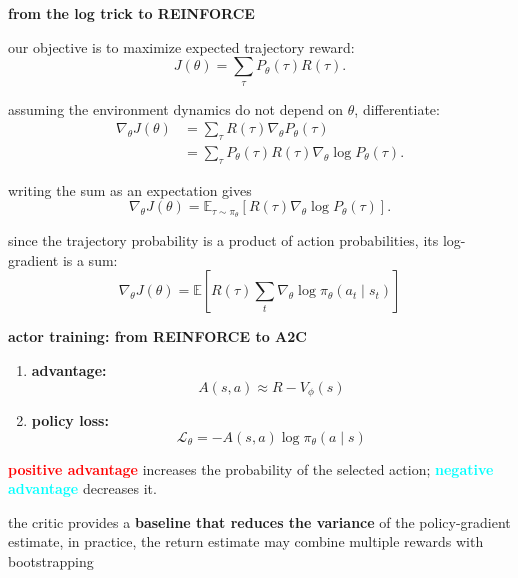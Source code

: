 \documentclass[xcolor=dvipsnames]{beamer}
\begin{document}
\begin{frame}{\bf from the log trick to REINFORCE}

our objective is to maximize expected trajectory reward:
\[
  J(\theta)=\sum_\tau P_\theta(\tau)R(\tau).
\]

assuming the environment dynamics do not depend on $\theta$,
differentiate:
\[
\begin{aligned}
\nabla_\theta J(\theta)
  &=\sum_\tau R(\tau)\nabla_\theta P_\theta(\tau)\\
  &=\sum_\tau P_\theta(\tau)R(\tau)
       \nabla_\theta\log P_\theta(\tau).
\end{aligned}
\]

writing the sum as an expectation gives
\[
  \nabla_\theta J(\theta)
  =\mathbb{E}_{\tau\sim\pi_\theta}
    \left[
      R(\tau)\nabla_\theta\log P_\theta(\tau)
    \right].
\]

since the trajectory probability is a product of action
probabilities, its log-gradient is a sum:
\[
  \boxed{
    \nabla_\theta J(\theta)
    =\mathbb{E}\left[
      R(\tau)\sum_t
      \nabla_\theta\log\pi_\theta(a_t\mid s_t)
    \right]
  }
\]

\end{frame}



\begin{frame}{\bf actor training: from REINFORCE to A2C}

\begin{enumerate}
  \item \textbf{advantage:}
    \[
      A(s,a)\approx R-V_\phi(s)
    \]

  \item \textbf{policy loss:}
    \[
      \mathcal{L}_\theta
      =-A(s,a)\log\pi_\theta(a\mid s)
    \]
\end{enumerate}

\small

\textbf{\textcolor{red}{positive advantage}} increases the probability of the selected
action; \textbf{\textcolor{cyan}{negative advantage}} decreases it.

the critic provides a \textbf{baseline that reduces the variance} of
the policy-gradient estimate, in practice, the return estimate
may combine multiple rewards with bootstrapping

\end{frame}
\end{document}
